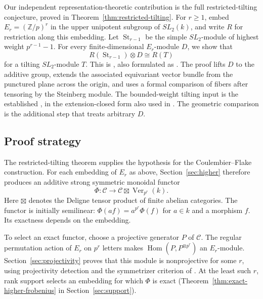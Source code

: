 Our independent representation-theoretic contribution is the full
restricted-tilting conjecture, proved in
Theorem~\ref{thm:restricted-tilting}.
For $r\geq1$, embed $E_r=(\mathbb Z/p)^r$ in the upper unipotent subgroup
of $SL_2(k)$, and write $R$ for restriction along this embedding.
Let $\operatorname{St}_{r-1}$ be the simple $SL_2$-module of highest
weight $p^{r-1}-1$. For every finite-dimensional $E_r$-module $D$, we
show that
\[
 R(\operatorname{St}_{r-1})\otimes D\cong R(T)
\]
for a tilting $SL_2$-module $T$. This is
\cite[Conjecture~5.4.2(1)]{CoulembierFlakeHigher}, also formulated as
\cite[Conjecture~1]{CoulembierFlakeSteinberg}.
The proof lifts $D$ to the additive group, extends the associated
equivariant vector bundle from the punctured plane across the origin,
and uses a formal comparison of fibers after tensoring by the
Steinberg module. The bounded-weight tilting input is the established
\cite[Lemma~3.3]{BEO2023}, in the extension-closed form also used in
\cite[proof of Lemma~3.1.6]{CoulembierFlakeSteinberg}.
The geometric comparison is the additional step that treats arbitrary $D$.

\subsection*{Proof strategy}

The restricted-tilting theorem supplies the hypothesis for the
Coulembier--Flake construction. For each embedding of $E_r$ as above,
Section~\ref{sec:higher} therefore produces an additive strong symmetric
monoidal functor
\[
 \Phi:\mathcal C\longrightarrow
 \mathcal C\boxtimes\operatorname{Ver}_{p^r}(k).
\]
Here $\boxtimes$ denotes the Deligne tensor product of finite abelian
categories. The functor is initially semilinear:
$\Phi(af)=a^{p^r}\Phi(f)$ for $a\in k$ and a morphism $f$.
Its exactness depends on the embedding.

To select an exact functor, choose a projective generator $P$ of
$\mathcal C$. The regular permutation action of $E_r$ on $p^r$ letters
makes $\operatorname{Hom}(P,P^{\otimes p^r})$ an $E_r$-module.
Section~\ref{sec:projectivity} proves that this module is nonprojective
for some $r$, using projectivity detection and the symmetrizer criterion
of \cite[Lemma~4.10]{CoulembierEtingofOstrik2023}.
At the least such $r$, rank support selects an embedding for which
$\Phi$ is exact (Theorem~\ref{thm:exact-higher-frobenius} in
Section~\ref{sec:support}).

